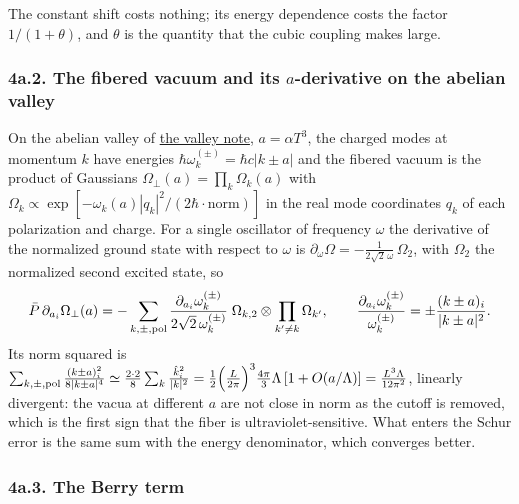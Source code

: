 \documentclass[11pt,a4paper]{article}
\begin{document}
The constant shift costs nothing; its energy dependence costs the factor
\(1/(1+\theta)\), and \(\theta\) is the quantity that the cubic coupling
makes large.

\hypertarget{a.2.-the-fibered-vacuum-and-its-a-derivative-on-the-abelian-valley}{%
\subsubsection{\texorpdfstring{4a.2. The fibered vacuum and its
\(a\)-derivative on the abelian
valley}{4a.2. The fibered vacuum and its a-derivative on the abelian valley}}\label{a.2.-the-fibered-vacuum-and-its-a-derivative-on-the-abelian-valley}}

On the abelian valley of \href{torus-valley-potential.md}{the valley
note}, \(a=\alpha T^3\), the charged modes at momentum \(k\) have
energies \(\hbar\omega_k^{(\pm)}=\hbar c|k\pm a|\) and the fibered
vacuum is the product of Gaussians
\(\Omega_\perp(a)=\prod_k\Omega_k(a)\) with
\(\Omega_k\propto\exp[-\omega_k(a)|q_k|^2/(2\hbar\cdot\text{norm})]\) in
the real mode coordinates \(q_k\) of each polarization and charge. For a
single oscillator of frequency \(\omega\) the derivative of the
normalized ground state with respect to \(\omega\) is
\(\partial_\omega\Omega=-\frac{1}{2\sqrt2\,\omega}\,\Omega_2\), with
\(\Omega_2\) the normalized second excited state, so
\[\bar P\,\partial_{a_i}\Omega_\perp(a)=-\sum_{k,\pm,{\rm pol}}\frac{\partial_{a_i}\omega_k^{(\pm)}}{2\sqrt2\,\omega_k^{(\pm)}}\;\Omega_{k,2}\otimes\prod_{k'\ne k}\Omega_{k'},
\qquad\frac{\partial_{a_i}\omega_k^{(\pm)}}{\omega_k^{(\pm)}}=\pm\frac{(k\pm a)_i}{|k\pm a|^2}.\]
Its norm squared is
\(\sum_{k,\pm,{\rm pol}}\frac{(k\pm a)_i^2}{8|k\pm a|^4}\simeq\frac{2\cdot2}{8}\sum_k\frac{\hat k_i^2}{|k|^2} =\frac12\Big(\frac L{2\pi}\Big)^3\frac{4\pi}{3}\Lambda\,[1+O(a/\Lambda)]=\frac{L^3\Lambda}{12\pi^2}\),
linearly divergent: the vacua at different \(a\) are not close in norm
as the cutoff is removed, which is the first sign that the fiber is
ultraviolet-sensitive. What enters the Schur error is the same sum with
the energy denominator, which converges better.

\hypertarget{a.3.-the-berry-term}{%
\subsubsection{4a.3. The Berry term}\label{a.3.-the-berry-term}}
\end{document}
